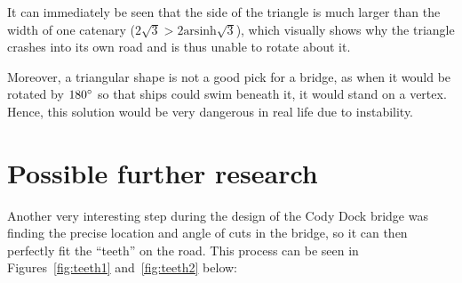 \documentclass[12pt]{article}
\begin{document}
        It can immediately be seen that the side of the triangle is much larger than the width of one catenary ($2\sqrt{3} > 2\text{arsinh}\sqrt{3}$), which visually shows why the triangle crashes into its own road and is thus unable to rotate about it.

        Moreover, a triangular shape is not a good pick for a bridge, as when it would be rotated by $180\degree$ so that ships could swim beneath it, it would stand on a vertex. Hence, this solution would be very dangerous in real life due to instability.

    \section{Possible further research}

        Another very interesting step during the design of the Cody Dock bridge was finding the precise location and angle of cuts in the bridge, so it can then perfectly fit the ``teeth'' on the road. This process can be seen in Figures~\ref{fig:teeth1} and~\ref{fig:teeth2} below:
\end{document}
